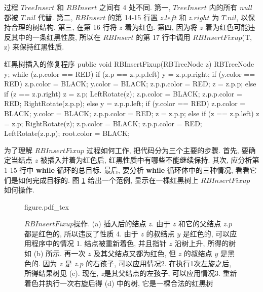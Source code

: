 \documentclass[oneside,10pt,fontset=none]{ctexbook}
\numberwithin{definition}{chapter}
\numberwithin{theorem}{chapter}
\numberwithin{lemma}{chapter}
\begin{document}
过程 $TreeInsert$ 和 $RBInsert$ 之间有 4 处不同. 第一, $TreeInsert$ 内的所有 $null$ 都被 $T.nil$ 代替. 第二, $RBInsert$ 的第 14-15 行置 $z.left$ 和 $z.right$ 为 $T.nil$, 以保持合理的树结构. 第三, 在第 16 行将 $z$ 着为红色. 第四, 因为将 $z$ 着为红色可能违反其中的一条红黑性质, 所以在 $RBInsert$ 的第 17 行中调用 $RBInsertFixup$(T, z) 来保持红黑性质.

\begin{myjava}{}{红黑树插入的修复程序}{}
public void RBInsertFixup(RBTreeNode z) {
    RBTreeNode y;
    while (z.p.color == RED) {
        if (z.p == z.p.p.left) {
            y = z.p.p.right;
            if (y.color == RED) {
                z.p.color = BLACK;
                y.color = BLACK;
                z.p.p.color = RED;
                z = z.p.p;
            } else {
                if (z == z.p.right) {
                    z = z.p;
                    LeftRotate(z);
                }
                z.p.color = BLACK;
                z.p.p.color = RED;
                RightRotate(z.p.p);
            }
        } else {
            y = z.p.p.left;
            if (y.color == RED) {
                z.p.color = BLACK;
                y.color = BLACK;
                z.p.p.color = RED;
                z = z.p.p;
            } else {
                if (z == z.p.left) {
                    z = z.p;
                    RightRotate(z);
                }
                z.p.color = BLACK;
                z.p.p.color = RED;
                LeftRotate(z.p.p);
            }
        }
    }
    root.color = BLACK;
}
\end{myjava}

为了理解 $RBInsertFixup$ 过程如何工作, 把代码分为三个主要的步骤. 首先, 要确定当结点 $z$ 被插入并着为红色后, 红黑性质中有哪些不能继续保持. 其次, 应分析第 1-15 行中 \textbf{while} 循环的总目标. 最后, 要分析 \textbf{while} 循环体中的三种情况, 看看它们是如何完成目标的. 图 \ref{fig:红黑树插入过程的修复} 给出一个范例, 显示在一棵红黑树上 $RBInsertFixup$ 如何操作.

\begin{figure}[htbp]
    \centering
    \def\svgwidth{\columnwidth}
    {figure.pdf_tex}
    \caption{$RBInsertFixup$操作. (a) 插入后的结点 $z$. 由于 $z$ 和它的父结点 $z.p$ 都是红色的, 所以违反了性质 4. 由于 $z$ 的叔结点 $y$ 是红色的, 可以应用程序中的情况 1. 结点被重新着色, 并且指针 $z$ 沿树上升, 所得的树如 (b) 所示. 再一次 $z$ 及其父结点又都为红色, 但 $z$ 的叔结点 $y$ 是黑色的. 因为 $z$ 是 $z.p$ 的右孩子, 可以应用情况2. 在执行1次左旋之后, 所得结果树见 (c). 现在, $z$是其父结点的左孩子, 可以应用情况3. 重新着色并执行一次右旋后得 (d) 中的树, 它是一棵合法的红黑树}
    \label{fig:红黑树插入过程的修复}
\end{figure}
\end{document}
